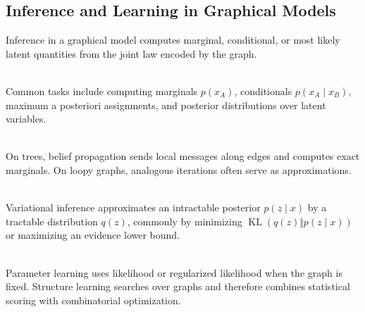 \subsection{Inference and Learning in Graphical Models}

Inference in a graphical model computes marginal, conditional, or most likely latent quantities from the joint law encoded by the graph.

\begin{definition} \label{def:sl-graphical-model-inference-tasks} \\
Common tasks include computing marginals $p(x_A)$, conditionals $p(x_A\mid x_B)$, maximum a posteriori assignments, and posterior distributions over latent variables.
\end{definition}

\begin{method} \label{method:sl-message-passing} \\
On trees, belief propagation sends local messages along edges and computes exact marginals.  On loopy graphs, analogous iterations often serve as approximations.
\end{method}

\begin{definition} \label{def:sl-variational-inference} \\
Variational inference approximates an intractable posterior $p(z\mid x)$ by a tractable distribution $q(z)$, commonly by minimizing $\operatorname{KL}(q(z)\Vert p(z\mid x))$ or maximizing an evidence lower bound.
\end{definition}

\begin{remark} \label{rem:sl-graphical-learning} \\
Parameter learning uses likelihood or regularized likelihood when the graph is fixed.  Structure learning searches over graphs and therefore combines statistical scoring with combinatorial optimization.
\end{remark}
